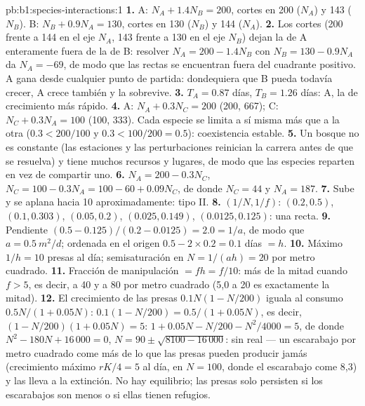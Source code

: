 \begin{solution}{pb:b1:species-interactions:1}
\textbf{1.} A: $N_A + 1.4 N_B = 200$, cortes en 200 ($N_A$) y 143
($N_B$). B: $N_B + 0.9 N_A = 130$, cortes en 130 ($N_B$) y 144
($N_A$).
\textbf{2.} Los cortes (200 frente a 144 en el eje $N_A$, 143
frente a 130 en el eje $N_B$) dejan la  de A enteramente fuera de la
de B: resolver $N_A = 200 - 1.4 N_B$ con $N_B = 130 - 0.9 N_A$ da
$N_A = -69$, de modo que las rectas se encuentran fuera del cuadrante
positivo. A gana desde cualquier punto de partida: dondequiera que B pueda
todavía crecer, A crece también y la sobrevive.
\textbf{3.} $T_A = 0.87$ días, $T_B = 1.26$ días: A, la de crecimiento más
rápido.
\textbf{4.} A: $N_A + 0.3 N_C = 200$ (200, 667); C: $N_C + 0.3 N_A =
100$ (100, 333). Cada especie se limita a sí misma más que a la otra
($0.3 < 200/100$ y $0.3 < 100/200 = 0.5$): coexistencia estable.
\textbf{5.} Un bosque no es constante (las estaciones y las perturbaciones
reinician la carrera antes de que se resuelva) y tiene muchos recursos y
lugares, de modo que las especies reparten  en vez de compartir uno.
\textbf{6.} $N_A = 200 - 0.3 N_C$, $N_C = 100 - 0.3 N_A = 100 - 60 +
0.09 N_C$, de donde $N_C = 44$ y $N_A = 187$.
\textbf{7.} Sube y se aplana hacia 10 aproximadamente: tipo II.
\textbf{8.} $(1/N, 1/f)$: $(0.2, 0.5)$, $(0.1, 0.303)$, $(0.05, 0.2)$,
$(0.025, 0.149)$, $(0.0125, 0.125)$: una recta.
\textbf{9.} Pendiente $(0.5 - 0.125)/(0.2 - 0.0125) = 2.0 = 1/a$, de modo
que $a =
\qty{0.5}{m^2/d}$; ordenada en el origen $0.5 - 2\times 0.2 = 0.1$
días $= h$.
\textbf{10.} Máximo $1/h = 10$ presas al día; semisaturación en $N =
1/(ah) = 20$ por metro cuadrado.
\textbf{11.} Fracción de manipulación $= f h = f/10$: más de la mitad cuando
$f
> 5$, es decir, a 40 y a 80 por metro cuadrado (5,0 a 20 es exactamente
la mitad).
\textbf{12.} El crecimiento de las presas $0.1 N (1 - N/200)$ iguala al
consumo $0.5N/(1 + 0.05N)$: $0.1(1 - N/200) = 0.5/(1 + 0.05 N)$, es decir,
$(1 - N/200)(1 + 0.05N) = 5$: $1 + 0.05N - N/200 - N^2/4000 = 5$, de donde
$N^2 - 180 N + 16\,000 = 0$, $N = 90 \pm \sqrt{8100 - 16\,000}$: sin 
real --- un escarabajo por metro cuadrado come más de lo que las presas
pueden producir jamás (crecimiento máximo $rK/4 = 5$ al día, en $N = 100$,
donde el escarabajo come 8,3) y las lleva a la extinción. No hay equilibrio;
las presas solo persisten si los escarabajos son menos o si ellas tienen
refugios.

\end{solution}

